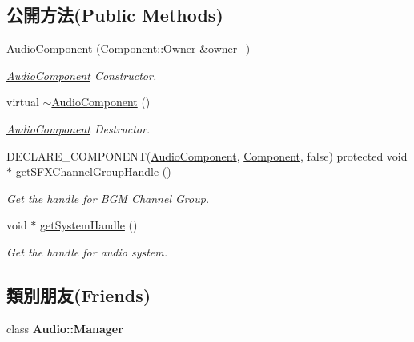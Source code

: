 \subsection*{公開方法(Public Methods)}
\begin{DoxyCompactItemize}
\item 
\hyperlink{class_magnum_1_1_audio_component_a45436b6739b5a0d6bedd8cbb9318a3c6}{Audio\+Component} (\hyperlink{class_magnum_1_1_component_1_1_owner}{Component\+::\+Owner} \&owner\+\_\+)
\begin{DoxyCompactList}\small\item\em \hyperlink{class_magnum_1_1_audio_component}{Audio\+Component} Constructor. \end{DoxyCompactList}\item 
virtual \hyperlink{class_magnum_1_1_audio_component_a68bf2351458d61601aad7abeb3f58588}{$\sim$\+Audio\+Component} ()
\begin{DoxyCompactList}\small\item\em \hyperlink{class_magnum_1_1_audio_component}{Audio\+Component} Destructor. \end{DoxyCompactList}\item 
D\+E\+C\+L\+A\+R\+E\+\_\+\+C\+O\+M\+P\+O\+N\+E\+NT(\hyperlink{class_magnum_1_1_audio_component}{Audio\+Component}, \hyperlink{class_magnum_1_1_component}{Component}, false) protected void $\ast$ \hyperlink{class_magnum_1_1_audio_component_a0c2a36f6dde86cd50f889cbc5825da17}{get\+S\+F\+X\+Channel\+Group\+Handle} ()
\begin{DoxyCompactList}\small\item\em Get the handle for B\+GM Channel Group. \end{DoxyCompactList}\item 
void $\ast$ \hyperlink{class_magnum_1_1_audio_component_a66fcbd1e83043254ed81220d82c0c565}{get\+System\+Handle} ()
\begin{DoxyCompactList}\small\item\em Get the handle for audio system. \end{DoxyCompactList}\end{DoxyCompactItemize}
\subsection*{類別朋友(Friends)}
\begin{DoxyCompactItemize}
\item 
class {\bfseries Audio\+::\+Manager}\hypertarget{class_magnum_1_1_audio_component_a3ad7b469f47b268897de410969c1c7cd}{}\label{class_magnum_1_1_audio_component_a3ad7b469f47b268897de410969c1c7cd}

\end{DoxyCompactItemize}


